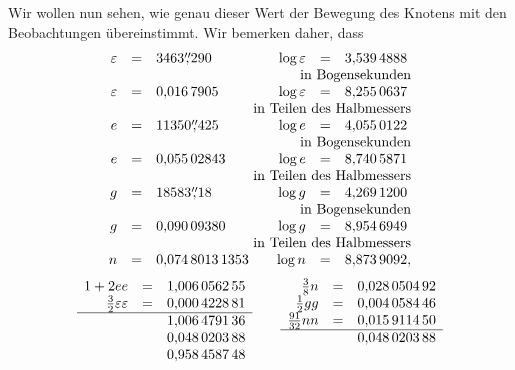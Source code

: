 \clearpage
\begingroup
{}
\renewcommand{\headrulewidth}{0pt}
\par\noindent\hspace*{\parindent}Wir wollen nun sehen, wie genau dieser Wert der Bewegung des
Knotens mit den Beobachtungen übereinstimmt. Wir bemerken daher, dass
\begingroup\small
\setlength{\arraycolsep}{2pt}
\renewcommand{\arraystretch}{1.15}
\[
\begin{array}{rcl@{\qquad}rcl}
\varepsilon&=&3463\overset{\prime\prime}{,}290
 &\log\varepsilon&=&3{,}539\,4888\\
\multicolumn{6}{r}{\text{in Bogensekunden}}\\
\varepsilon&=&0{,}016\,7905
 &\log\varepsilon&=&8{,}255\,0637\\
\multicolumn{6}{r}{\text{in Teilen des Halbmessers}}\\
e&=&11350\overset{\prime\prime}{,}425
 &\log e&=&4{,}055\,0122\\
\multicolumn{6}{r}{\text{in Bogensekunden}}\\
e&=&0{,}055\,02843
 &\log e&=&8{,}740\,5871\\
\multicolumn{6}{r}{\text{in Teilen des Halbmessers}}\\
g&=&18583\overset{\prime\prime}{,}18
 &\log g&=&4{,}269\,1200\\
\multicolumn{6}{r}{\text{in Bogensekunden}}\\
g&=&0{,}090\,09380
 &\log g&=&8{,}954\,6949\\
\multicolumn{6}{r}{\text{in Teilen des Halbmessers}}\\
n&=&0{,}074\,8013\,1353
 &\log n&=&8{,}873\,9092,
\end{array}
\]
\[
\begin{array}[t]{rcl}
1+2ee&=&1{,}006\,0562\,55\\
\tfrac32\varepsilon\varepsilon&=&0{,}000\,4228\,81\\
\hline
&&1{,}006\,4791\,36\\
&&0{,}048\,0203\,88\\
&&0{,}958\,4587\,48
\end{array}
\qquad
\begin{array}[t]{rcl}
\tfrac38n&=&0{,}028\,0504\,92\\
\tfrac12gg&=&0{,}004\,0584\,46\\
\tfrac{91}{32}nn&=&0{,}015\,9114\,50\\
\hline
&&0{,}048\,0203\,88
\end{array}
\]
\endgroup
{}
